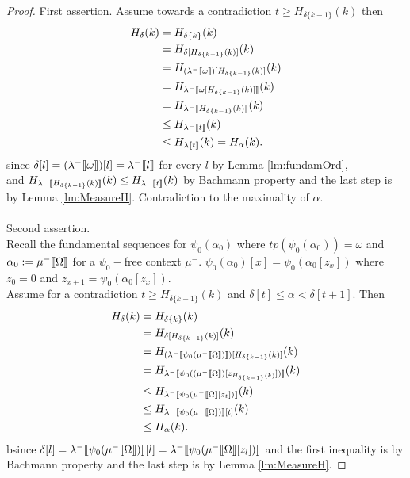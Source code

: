 \documentclass{amsart}
\theoremstyle{plain}
\theoremstyle{plain}
\def\scbrl{[\hspace{-.14em}[}
\def\scbrr{]\hspace{-.14em}]}
\def\scbr#1{\scbrl#1\scbrr}
\newcommand{\Om}{{\Omega}}
\newcommand{\al}{{\alpha}}
\newcommand{\be}{{\beta}}
\newcommand{\de}{\delta}
\newcommand{\la}{\lambda}
\newcommand{\om}{\omega}
\def\scbrl{[\hspace{-.14em}[}
\def\scbrr{]\hspace{-.14em}]}
\def\scbr#1{\scbrl#1\scbrr}
\begin{document}
\begin{proof}
First assertion. 
Assume towards a contradiction $t\geq H_{\de\{k-1\}}(k)$ then
\begin{align*}
    H_\de(k) &=H_{\de\{k\}}(k) \\
    &=H_{\de[H_{\de\{k-1\}}(k)]} (k) \\
    &= H_{(\la^-\scbr{\om})[H_{\de\{k-1\}}(k)]}(k)\\
    &= H_{\la^-\scbr{\om[H_{\de\{k-1\}}(k)]}}(k)\\
    &= H_{\la^-\scbr{H_{\de\{k-1\}}(k)}} (k)\\
    & \leq H_{\la^-\scbr{t}}(k)\\
    & \leq H_{\la\scbr{t}}(k) =  H_\al(k).
\end{align*}
since  $\de[l] = (\la^-\scbr{\om})[l] =  \la^-\scbr{l} $ for every $l$ by Lemma \ref{lm:fundamOrd}, \\
and $H_{\la^-\scbr{H_{\de\{k-1\}}(k)}} (k) \leq H_{\la^-\scbr{t}}(k) $ by Bachmann property and the last step is by Lemma \ref{lm:MeasureH}.
Contradiction to the maximality of $\al$.\medskip
\\\\%
Second assertion. \\
Recall the fundamental sequences for $\psi_0(\al_0)$ where $tp(\psi_0(\al_0))=\om$ and $\al_0 :=\mu^-\scbr{\Om}$ for a $\psi_0-$free context $\mu^-$.
$\psi_0(\al_0)[x] = \psi_0(\al_0[z_x])$ where $z_0=0$ and $z_{x+1}= \psi_0(\al_0[z_x])$.\\
Assume for a contradiction  $t\geq H_{\de\{k-1\}}(k)$ and $\de[t]\leq \al<\de[t+1]$.
Then  
\begin{align*}
    H_\de(k) & = H_{\de\{k\}}(k) \\
    & = H_{\de[H_{\de\{k-1\}}(k)]}(k)\\
    &= H_{(\la^-\scbr{\psi_0(\mu^-\scbr{\Om})})[H_{\de\{k-1\}}(k)]} (k) \\
    &= H_{\la^-\scbr{\psi_0((\mu^-\scbr{\Om})[z_{H_{\de\{k-1\}}(k)}] )}}(k) \\ 
    &\leq H_{\la^-\scbr{\psi_0(\mu^-\scbr{\Om}[z_t])} }(k) \\
    &\leq H_{\la^-\scbr{\psi_0(\mu^-\scbr{\Om})}[t] }(k) \\
    &\leq H_\al(k).
\end{align*}
bsince $\de[l] = \la^-\scbr{\psi_0(\mu^-\scbr{\Om})}[l] = \la^-\scbr{\psi_0(\mu^-\scbr{\Om}[z_l])}$ and the first inequality is by Bachmann property and the last step is by Lemma \ref{lm:MeasureH}.

\end{proof}
\end{document}

